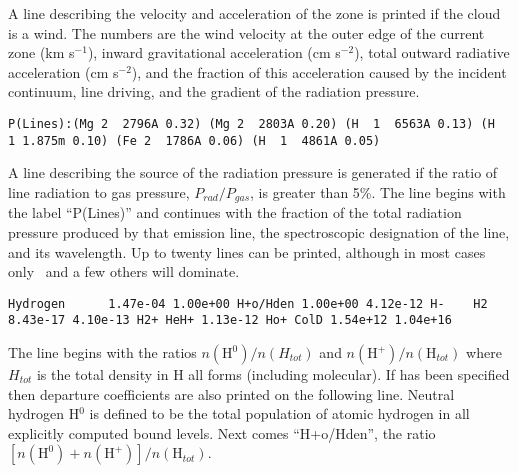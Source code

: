 A line describing the velocity and acceleration of the zone is printed
if the cloud is a wind.
The numbers are the wind velocity at the outer
edge of the current zone (km s$^{-1}$), inward gravitational acceleration (cm s$^{-2}$), total outward radiative acceleration (cm s$^{-2}$),
and the fraction of
this acceleration caused by the incident continuum, line driving, and the
gradient of the radiation pressure.
{\setverbatimfontsize{\tiny}
\begin{verbatim}
P(Lines):(Mg 2  2796A 0.32) (Mg 2  2803A 0.20) (H  1  6563A 0.13) (H  1 1.875m 0.10) (Fe 2  1786A 0.06) (H  1  4861A 0.05)
\end{verbatim}
}
A line describing the source of the radiation pressure is generated if
the ratio of line radiation to gas pressure, $P_{rad}/P_{gas}$,
is greater than 5\%.
The line begins with the label ``P(Lines)'' and
continues with the fraction
of the total radiation pressure produced by that emission line, the
spectroscopic designation of the line, and its wavelength.
Up to twenty
lines can be printed, although in most cases only \la\
and a few others will dominate.
{\setverbatimfontsize{\tiny}
\begin{verbatim}
Hydrogen      1.47e-04 1.00e+00 H+o/Hden 1.00e+00 4.12e-12 H-    H2 8.43e-17 4.10e-13 H2+ HeH+ 1.13e-12 Ho+ ColD 1.54e+12 1.04e+16
\end{verbatim}
}

The line begins with the ratios $n(\mathrm{H}^0)/n(H_{tot})$ and
$n(\mathrm{H}^+)/n(\mathrm{H}_{tot})$ where
$H_{tot}$ is the total density in H all forms (including molecular).
If \cdCommand{print h-like departure coefficients} has been specified
then departure coefficients
are also printed on the following line.
Neutral hydrogen H$^0$ is defined
to be the total population of atomic hydrogen in all explicitly computed
bound levels.
Next comes ``H+o/Hden'', the ratio
$[n(\mathrm{H}^0) + n(\mathrm{H}^+)]/n(\mathrm{H}_{tot})$.

